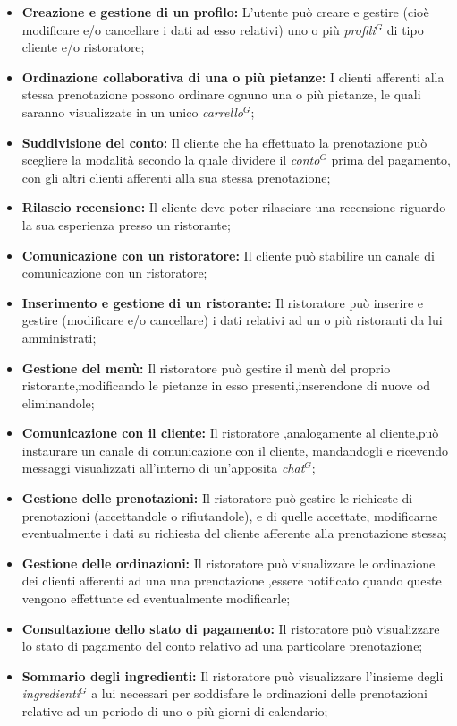 \begin{itemize}
    \item \textbf{Creazione e gestione di un profilo:} L'utente può creare e gestire (cioè modificare e/o
      cancellare i dati ad esso relativi) uno o più \emph{profili}$^{G}$ di tipo cliente e/o ristoratore;
    \item \textbf{Ordinazione collaborativa di una o più pietanze:} I clienti afferenti alla stessa prenotazione
      possono ordinare ognuno una o più pietanze, le quali saranno visualizzate in un unico \emph{carrello}$^{G}$;
    \item \textbf{Suddivisione del conto:} Il cliente che ha effettuato la prenotazione può scegliere la modalità secondo la quale
      dividere il \emph{conto}$^{G}$ prima del pagamento, con gli altri clienti afferenti alla sua stessa prenotazione;
    \item \textbf{Rilascio recensione:} Il cliente deve poter rilasciare una recensione riguardo la sua
    esperienza presso un ristorante;
    \item \textbf{Comunicazione con un ristoratore:} Il cliente può stabilire un canale di comunicazione con un
    ristoratore;
    \item \textbf{Inserimento e gestione di un ristorante:} Il ristoratore può inserire e gestire (modificare e/o cancellare)
    i dati relativi ad un o più ristoranti da lui amministrati;
    \item \textbf{Gestione del menù:} Il ristoratore può gestire il menù del proprio ristorante,modificando le pietanze in esso
    presenti,inserendone di nuove od eliminandole;
    \item \textbf{Comunicazione con il cliente:} Il ristoratore ,analogamente al cliente,può instaurare un canale di comunicazione
      con il cliente, mandandogli e ricevendo messaggi visualizzati all'interno di un'apposita \emph{chat}$^{G}$;
    \item \textbf{Gestione delle prenotazioni:} Il ristoratore può gestire le richieste di prenotazioni (accettandole o rifiutandole), e
    di quelle accettate, modificarne eventualmente i dati su richiesta del cliente afferente alla prenotazione stessa;
    \item \textbf{Gestione delle ordinazioni:} Il ristoratore può visualizzare le ordinazione dei clienti afferenti ad una
    una prenotazione ,essere notificato quando queste vengono effettuate ed eventualmente modificarle;
    \item \textbf{Consultazione dello stato di pagamento:} Il ristoratore può visualizzare lo stato di pagamento del conto relativo ad una
    particolare prenotazione;
  \item \textbf{Sommario degli ingredienti:} Il ristoratore può visualizzare l'insieme degli \emph{ingredienti}$^{G}$ a lui necessari per soddisfare
    le ordinazioni delle prenotazioni  relative ad un periodo di uno o più giorni di calendario;
\end{itemize}
